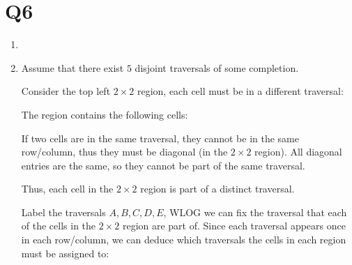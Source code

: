 \documentclass[a4paper, 11pt]{article}
\begin{document}
\section*{Q6}
\begin{enumerate}[label=(\alph*)]
	\item 
	\item Assume that there exist $5$ disjoint traversals of some completion. 
	
	Consider the top left $2\times 2$ region, each cell must be in a different traversal: 
	\begin{mdframed}
		The region contains the following cells: 
		\begin{center}
		\end{center}

		If two cells are in the same traversal, they cannot be in the same row/column, thus they must be diagonal (in the $2\times 2$ region). All diagonal entries are the same, so they cannot be part of the same traversal. 

		Thus, each cell in the $2\times 2$ region is part of a distinct traversal. 
	\end{mdframed}

	Label the traversals $A,B,C,D,E$, WLOG we can fix the traversal that each of the cells in the $2\times 2$ region are part of. Since each traversal appears once in each row/column, we can deduce which traversals the cells in each region must be assigned to: 

	\begin{center}
\end{center}
\end{enumerate}
\end{document}
